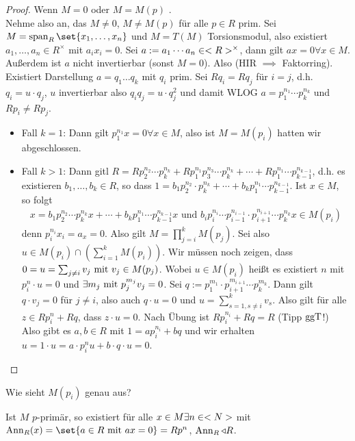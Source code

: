 \begin{proof}
	Wenn $M = 0$ oder $M = M(p)$ \checkmark.\\
	Nehme also an, das $M \neq 0$, $M \neq M(p)$ für alle $p \in R$ prim. Sei $M = \Span_R\set{x_1, \dots, x_n}$ und $M= T(M)$ Torsionsmodul, also existiert $a_1, \dots, a_n \in R^{\times}$ mit $a_i x _i = 0$. Sei $a:= a_1\cdots a_n \in \R^{\times}$, dann gilt $ax = 0\forall x \in M$. Außerdem ist $a$ nicht invertierbar (sonst $M=0$). Also (HIR $\implies$ Faktorring). Existiert Darstellung $a = q_1\dots q_k$ mit $q_i$ prim. Sei $Rq_i = Rq_j$ für $i=j$, d.h. $q_i = u \cdot q_j$, $u$ invertierbar also $q_i q_j = u\cdot q_j^2$ und damit WLOG $a = p_1^{n_1}\cdots p_k^{n_k}$ und $Rp_i \neq Rp_j$.
	\begin{itemize}
		\item Fall $k=1$: Dann gilt $p_1^{n_1}x = 0\forall x \in M$, also ist $M = M(p_i)$ hatten wir abgeschlossen.
		\item Fall $k>1$: Dann gitl $R = Rp_2^{n_2}\cdots p_k^{n_k}+Rp_1^{n_1}p_3^{n_3}\cdots p_k^{n_k} + \cdots + Rp_1^{n_1}\cdots p_{k-1}^{n_{k-1}}$, d.h. es existieren $b_1,\dots, b_k \in R$, so dass $1 = b_1 p_2^{n_2}\cdot p_k^{n_k}+\cdots + b_k p_1^{n_1}\cdots p_{k-1}^{n_{k-1}}$. Ist $x\in M$, so folgt
		\begin{align*}
			x = b_1p_2^{n_2}\cdots p_k^{n_k}x + \cdots + b_k p_1^{n_1}\cdots p_{k-1}^{n_{k-1}}x \text{ und } b_i p_i^{n_i}\cdots p_{i-1}^{n_{i-1}}\cdot p_{i+1}^{n_{i+1}}\cdots p_k^{n_k} x \in M(p_i)
		\end{align*}
		denn $p_i^{n_i} x_i = a_x = 0$. Also gilt $M = \prod_{j=i}^k M(p_j)$. Sei also $u \in M(p_i) \cap (\sum_{i=1}^k M(p_i))$. Wir müssen noch zeigen, dass $0=u = \sum_{j\neq i} v_j \mit v_j \in M(p_j)$. Wobei $u \in M(p_i)$ heißt es existiert $n$ mit $p_i^n \cdot u = 0$ und $\exists m_j \mit p_j^{m_j} v_j = 0$. Sei $q := p_1^{m_1}\cdot p_{i+1}^{m_{i+1}}\cdots p_k^{m_k}$. Dann gilt $q \cdot v_j = 0$ für $j \neq i$, also auch $q\cdot u = 0$ und $u = \sum_{s=1, s\neq i}^k v_s$. Also gilt für alle $z \in R p_i^n + R q$, dass $z \cdot u = 0$. Nach Übung ist $R p_i^{n_i} + Rq = R$ (Tipp $\ggT$!) Also gibt es $a,b \in R$ mit $1 = a p_i ^{n_i} + bq$ und wir erhalten $u = 1\cdot u = a\cdot p_i^n u + b\cdot q \cdot u = 0$.
	\end{itemize}
\end{proof}
Wie sieht $M(p_i)$ genau aus?
\begin{lemma}
	Ist $M$ $p$-primär, so existiert für alle $x \in M \exists n \in \N$ mit $\Ann_R(x) = \set{ a \in R \mit ax = 0} = Rp^n$, $\Ann_R \lhd R$.
\end{lemma}
